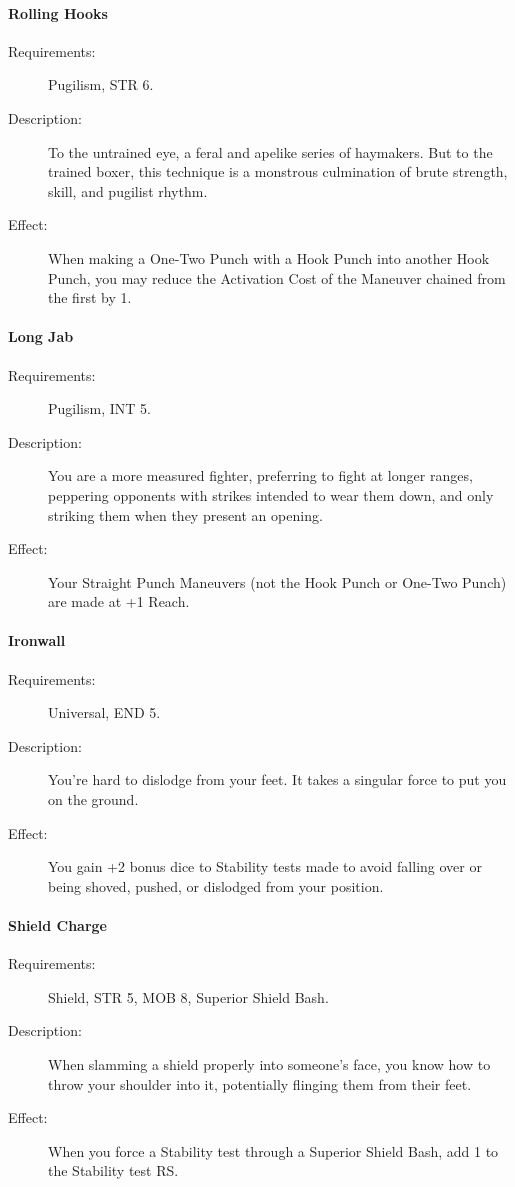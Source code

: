 \documentclass[oneside,11pt,english]{book}
\begin{document}
\paragraph{\label{talent:Rolling Hooks}Rolling Hooks}
	\begin{description}
		\item [Requirements:] Pugilism, STR 6. 
		\item [Description:] To the untrained eye, a feral and apelike series of haymakers. But to the trained boxer, this technique is a monstrous culmination of brute strength, skill, and pugilist rhythm. 
		\item [Effect:] When making a One-Two Punch with a Hook Punch into another Hook Punch, you may reduce the Activation Cost of the Maneuver chained from the first by 1. 

	\end{description}
\paragraph{\label{talent:Long Jab}Long Jab}
	\begin{description}
		\item [Requirements:] Pugilism, INT 5. 
		\item [Description:] You are a more measured fighter, preferring to fight at longer ranges, peppering opponents with strikes intended to wear them down, and only striking them when they present an opening. 
		\item [Effect:] Your Straight Punch Maneuvers (not the Hook Punch or One-Two Punch) are made at +1 Reach.

	\end{description}
\paragraph{\label{talent:Ironwall}Ironwall}
	\begin{description}
		\item [Requirements:] Universal, END 5. 
		\item [Description:] You’re hard to dislodge from your feet. It takes a singular force to put you on the ground.
		\item [Effect:] You gain +2 bonus dice to Stability tests made to avoid falling over or being shoved, pushed, or dislodged from your position. 

	\end{description}
\paragraph{\label{talent:Shield Charge}Shield Charge}
	\begin{description}
		\item [Requirements:] Shield, STR 5, MOB 8, Superior Shield Bash. 
		\item [Description:] When slamming a shield properly into someone’s face, you know how to throw your shoulder into it, potentially flinging them from their feet. 
		\item [Effect:] When you force a Stability test through a Superior Shield Bash, add 1 to the Stability test RS. 

	\end{description}
\end{document}
